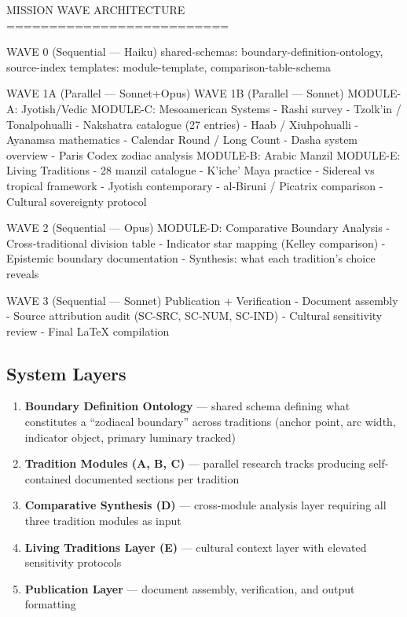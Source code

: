 \documentclass[11pt,letterpaper]{article}
\begin{document}
\begin{asciibox}
MISSION WAVE ARCHITECTURE
==========================

WAVE 0 (Sequential — Haiku)
  shared-schemas: boundary-definition-ontology, source-index
  templates: module-template, comparison-table-schema

WAVE 1A (Parallel — Sonnet+Opus)      WAVE 1B (Parallel — Sonnet)
  MODULE-A: Jyotish/Vedic              MODULE-C: Mesoamerican Systems
    - Rashi survey                       - Tzolk'in / Tonalpohualli
    - Nakshatra catalogue (27 entries)   - Haab / Xiuhpohualli
    - Ayanamsa mathematics               - Calendar Round / Long Count
    - Dasha system overview              - Paris Codex zodiac analysis
  MODULE-B: Arabic Manzil              MODULE-E: Living Traditions
    - 28 manzil catalogue                - K'iche' Maya practice
    - Sidereal vs tropical framework     - Jyotish contemporary
    - al-Biruni / Picatrix comparison    - Cultural sovereignty protocol

WAVE 2 (Sequential — Opus)
  MODULE-D: Comparative Boundary Analysis
    - Cross-traditional division table
    - Indicator star mapping (Kelley comparison)
    - Epistemic boundary documentation
    - Synthesis: what each tradition's choice reveals

WAVE 3 (Sequential — Sonnet)
  Publication + Verification
    - Document assembly
    - Source attribution audit (SC-SRC, SC-NUM, SC-IND)
    - Cultural sensitivity review
    - Final LaTeX compilation
\end{asciibox}

\subsection{System Layers}

\begin{enumerate}
  \item \textbf{Boundary Definition Ontology} --- shared schema defining what constitutes a ``zodiacal boundary'' across traditions (anchor point, arc width, indicator object, primary luminary tracked)
  \item \textbf{Tradition Modules (A, B, C)} --- parallel research tracks producing self-contained documented sections per tradition
  \item \textbf{Comparative Synthesis (D)} --- cross-module analysis layer requiring all three tradition modules as input
  \item \textbf{Living Traditions Layer (E)} --- cultural context layer with elevated sensitivity protocols
  \item \textbf{Publication Layer} --- document assembly, verification, and output formatting
\end{enumerate}
\end{document}
